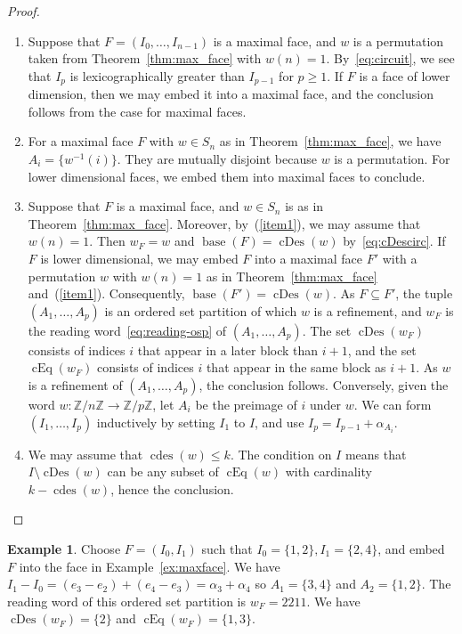\documentclass[12pt,reqno]{amsart}
\theoremstyle{plain}
\theoremstyle{definition}
\newtheorem{example}[theorem]{Example}
\newcommand{\Z}{\mathbb{Z}}
\DeclareMathOperator{\base}{base}
\DeclareMathOperator{\cEq}{cEq}
\DeclareMathOperator{\cDes}{cDes}
\DeclareMathOperator{\cdes}{cdes}
\begin{document}
\begin{proof}
	\noindent
	\begin{enumerate}
		\item\label{item1}
		Suppose that $ F=(I_0,\dots,I_{n-1}) $
		is a maximal face, and $w$ is a permutation taken from Theorem~\ref{thm:max_face} with $w(n)=1$.
		By~\eqref{eq:circuit}, we see that $I_p$ is lexicographically greater than $I_{p-1}$ for $p \geq 1$.
		If $ F $ is a face of lower dimension, then we may embed it into a maximal face, and the conclusion follows from the case for maximal faces.
		\item For a maximal face $ F $ with $ w \in S_n $ as in Theorem~\ref{thm:max_face}, we have $ A_i =
		\{w^{-1}(i)\} $. They are mutually disjoint because $ w $ is a permutation. For lower dimensional faces, we
		embed them into maximal faces to conclude.
		\item Suppose that $ F $ is a maximal face, and $ w \in S_n $ is as in Theorem~\ref{thm:max_face}. Moreover,
		by~(\ref{item1}), we may assume that $ w(n) = 1 $. Then $ w_F = w $ and $ \base(F) = \cDes(w) $
		by~\eqref{eq:cDescirc}. If $ F $ is lower dimensional, we may embed $ F $ into a maximal face $ F' $ with a
		permutation $ w $ with $ w(n) = 1 $ as in Theorem~\ref{thm:max_face} and~(\ref{item1}). Consequently, $
		\base(F') = \cDes(w) $. As $ F \subseteq F' $, the tuple $ (A_1,\dots,A_p) $ is an ordered set partition of
		which $ w $ is a refinement, and $ w_F $ is the reading word~\eqref{eq:reading-osp} of $ (A_1,\dots,A_p) $. The
		set $ \cDes(w_F) $ consists of indices $ i $ that appear in a later block than $ i+1 $, and the set $ \cEq(w_F)
		$ consists of indices $ i $ that appear in the same block as $ i+1 $. As $ w $ is a refinement of $
		(A_1,\dots,A_p) $, the conclusion follows. Conversely, given the word $ w: \Z/n\Z \to \Z/p\Z$, let $A_i$ be the
		preimage of $i$ under $w$. We can form $ (I_1,\dots,I_p) $ inductively by setting $ I_1 $ to $ I $, and use $
		I_p = I_{p-1}+\alpha_{A_i} $.
		\item We may assume that $ \cdes(w) \leq k $. The condition on $ I $ means that $ I \setminus \cDes(w) $ can be
		any subset of $ \cEq(w) $ with cardinality $ k-\cdes(w) $, hence the conclusion.
	\end{enumerate}
\end{proof}
\begin{example}
	Choose $F = (I_0,I_1)$ such that $I_0 = \{1,2\}, I_1 = \{2,4\}$, and embed $F$ into the face in Example~\ref{ex:maxface}.
	We have $I_1 - I_0 = (e_3-e_2) + (e_4-e_3) = \alpha_3 + \alpha_4$ so $A_1 = \{3,4\}$ and $A_2 = \{1,2\}$.
	The reading word of this ordered set partition is $w_F = 2211$.
	We have $\cDes(w_F) = \{2\}$ and $\cEq(w_F) = \{1,3\}$.
\end{example}
\end{document}
